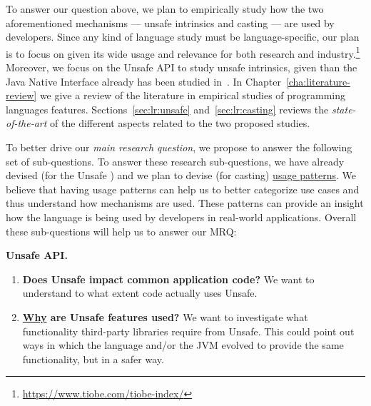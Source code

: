 To answer our question above,
we plan to empirically study how the two aforementioned mechanisms
--- unsafe intrinsics and casting ---
are used by developers.
Since any kind of language study must be language-specific,
our plan is to focus on \java{} given its wide usage and relevance for both
research and industry.\footnote{\url{https://www.tiobe.com/tiobe-index/}}
Moreover, we focus on the \java{} Unsafe API to study unsafe intrinsics,
given than the Java Native Interface already has been studied in~\cite{tanSafeJavaNative2006,tanEmpiricalSecurityStudy2008,kondohFindingBugsJava2008,sunNativeGuardProtectingAndroid2014,liFindingBugsExceptional2009}.
In Chapter~\ref{cha:literature-review} we give a review of the literature in empirical studies of programming languages features.
Sections~\ref{sec:lr:unsafe} and~\ref{sec:lr:casting} reviews the \emph{state-of-the-art} of the different aspects related to the two proposed studies.

To better drive our \emph{main research question},
we propose to answer the following set of
sub-questions.
To answer these research sub-questions,
we have already devised (for the Unsafe \api{}) and
we plan to devise (for casting)
\underline{usage patterns}.
We believe that having usage patterns can help us to better categorize use cases and
thus understand%
 how  mechanisms are used.
These patterns can provide an insight  how the language is being used by developers in real-world applications.
Overall these sub-questions will help us to answer our MRQ:

\textbf{ Unsafe API.}
\begin{enumerate}[label=$URQ\arabic*:$,ref=$URQ\arabic*$,leftmargin=3.4\parindent]
\item\label{unsafe:rq1}
{\bf Does Unsafe impact common application code?}
We want to understand to what extent 
code actually uses Unsafe.

\item\label{unsafe:rq2}
{\bf \underline{Why}  are Unsafe features used?}
We want to investigate what functionality third-party libraries require from Unsafe.
This could point out ways in which the \java{} language and/or
the JVM
evolved to provide the same functionality, but in a safer way.
\end{enumerate}

